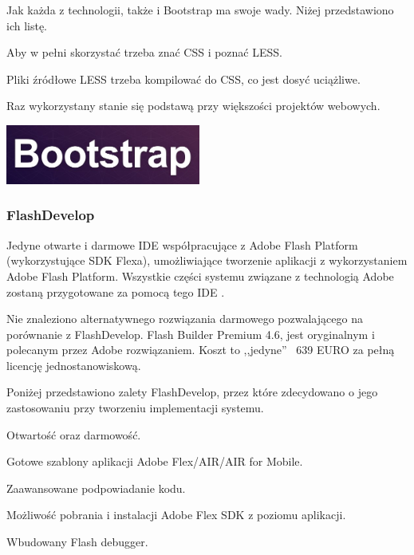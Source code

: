 Jak każda z technologii, także i Bootstrap ma swoje wady. Niżej przedstawiono ich listę.
\begin{packed_item}
    \item{Aby w pełni skorzystać trzeba znać CSS i poznać LESS.}
    \item{Pliki źródłowe LESS trzeba kompilować do CSS, co jest dosyć uciążliwe.}
    \item{Raz wykorzystany stanie się podstawą przy większości projektów webowych.}
\end{packed_item}

\begin{center}
    \includegraphics[width=0.48\textwidth]{img/logos/bootstrap.jpg}
\end{center}

\newpage
\subsubsection{FlashDevelop}
Jedyne otwarte i darmowe IDE współpracujące z Adobe Flash Platform (wykorzystujące SDK Flexa), umożliwiające tworzenie aplikacji z wykorzystaniem Adobe Flash Platform. Wszystkie części systemu związane z technologią Adobe zostaną przygotowane za pomocą tego IDE \cite{flashDevelop}.

Nie znaleziono alternatywnego rozwiązania darmowego pozwalającego na porównanie z FlashDevelop. Flash Builder Premium 4.6, jest oryginalnym i polecanym przez Adobe rozwiązaniem. Koszt to ,,jedyne'' ~639 EURO za pełną licencję jednostanowiskową.

Poniżej przedstawiono zalety FlashDevelop, przez które zdecydowano o jego zastosowaniu przy tworzeniu implementacji systemu.
\begin{packed_item}
    \item{Otwartość oraz darmowość.}
    \item{Gotowe szablony aplikacji Adobe Flex/AIR/AIR for Mobile.}
    \item{Zaawansowane podpowiadanie kodu.}
    \item{Możliwość pobrania i instalacji  Adobe Flex SDK z poziomu aplikacji.}
    \item{Wbudowany Flash debugger.}
\end{packed_item}

